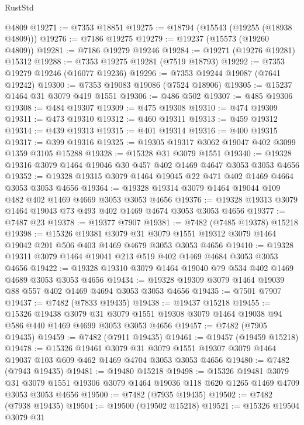 \begin{lexlean}{RustStd}
\begin{coremodule}
{\begin{coremodule}
{{{{{{{{{{{{{{{{{{{{{{{{{{{{{{{{    @4809
@19271 := @7353 @18851
@19275 := @18794 (@15543 (@19255 (@18938 @4809)))
@19276 := @7186 @19275
@19279 := @19237 (@15573 (@19260 @4809))
@19281 := @7186 @19279 @19246
@19284 := @19271 (@19276 @19281) @15312
@19288 := @7353 @19275 @19281 (@7519 @18793)
@19292 := @7353 @19279 @19246 (@16077 @19236)
@19296 := @7353 @19244 @19087 (@7641 @19242)
@19300 := @7353 @19083 @19086 (@7524 @18906)
@19305 := @15237 @1464 @31 @3079 @419 @1551
@19306 := @486 @502
@19307 := @485 @19306
@19308 := @484 @19307
@19309 := @475 @19308
@19310 := @474 @19309
@19311 := @473 @19310
@19312 := @460 @19311
@19313 := @459 @19312
@19314 := @439 @19313
@19315 := @401 @19314
@19316 := @400 @19315
@19317 := @399 @19316
@19325 := @19305 @19317 @3062 @19047 @402 @3099 @1359 @3105 @15288
@19328 := @15328 @31 @3079 @1551
@19340 := @19328 @19316 @3079 @1464 @19046 @30 @457 @402 @1469 @4647 @3053 @3053 @4656
@19352 := @19328 @19315 @3079 @1464 @19045 @22 @471 @402 @1469 @4664 @3053 @3053 @4656
@19364 := @19328 @19314 @3079 @1464 @19044 @109 @482 @402 @1469 @4669 @3053 @3053 @4656
@19376 := @19328 @19313 @3079 @1464 @19043 @73 @493 @402 @1469 @4674 @3053 @3053 @4656
@19377 := @7487 @23
@19378 := @19377 @7907
@19381 := @7482 (@7485 @19378) @15218
@19398 := @15326
    @19381
    @3079
    @31
    @3079
    @1551
    @19312
    @3079
    @1464
    @19042
    @201
    @506
    @403
    @1469
    @4679
    @3053
    @3053
    @4656
@19410 := @19328 @19311 @3079 @1464 @19041 @213 @519 @402 @1469 @4684 @3053 @3053 @4656
@19422 := @19328 @19310 @3079 @1464 @19040 @79 @534 @402 @1469 @4689 @3053 @3053 @4656
@19434 := @19328 @19309 @3079 @1464 @19039 @88 @557 @402 @1469 @4694 @3053 @3053 @4656
@19435 := @7501 @7907
@19437 := @7482 (@7833 @19435)
@19438 := @19437 @15218
@19455 := @15326
    @19438
    @3079
    @31
    @3079
    @1551
    @19308
    @3079
    @1464
    @19038
    @94
    @586
    @440
    @1469
    @4699
    @3053
    @3053
    @4656
@19457 := @7482 (@7905 @19435)
@19459 := @7482 (@7911 @19435)
@19461 := @19457 (@19459 @15218)
@19478 := @15326
    @19461
    @3079
    @31
    @3079
    @1551
    @19307
    @3079
    @1464
    @19037
    @103
    @609
    @462
    @1469
    @4704
    @3053
    @3053
    @4656
@19480 := @7482 (@7943 @19435)
@19481 := @19480 @15218
@19498 := @15326
    @19481
    @3079
    @31
    @3079
    @1551
    @19306
    @3079
    @1464
    @19036
    @118
    @620
    @1265
    @1469
    @4709
    @3053
    @3053
    @4656
@19500 := @7482 (@7935 @19435)
@19502 := @7482 (@7938 @19435)
@19504 := @19500 (@19502 @15218)
@19521 := @15326
    @19504
    @3079
    @31
}}}}}}}}}}}}}}}}}}}}}}}}}}}}}}}}
\end{coremodule}}
\end{coremodule}
\end{lexlean}
